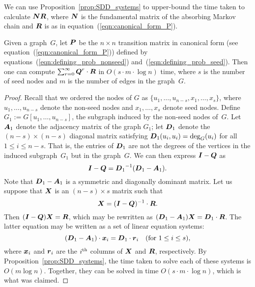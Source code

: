 We can use Proposition~\ref{prop:SDD_systems} to upper-bound the time taken to 
calculate $\boldsymbol{N} \boldsymbol{R}$, where $\boldsymbol{N}$ is the fundamental matrix of the absorbing
Markov chain and $\boldsymbol{R}$ is as in equation~(\ref{eqn:canonical_form_P}).
\begin{lemma}\label{lemma:computing_NR}
Given a graph~$G$, let $\boldsymbol{P}$ be the $n \times n$ transition matrix in canonical form 
(see equation~(\ref{eqn:canonical_form_P})) defined by equations~(\ref{eqn:defining_prob_nonseed}) 
and~(\ref{eqn:defining_prob_seed}). Then one can compute 
$\sum_{r = 0}^{\infty} \boldsymbol{Q}^r \cdot \boldsymbol{R}$ in $O(s \cdot m \cdot \log n)$ time, 
where $s$ is the number of seed nodes and $m$ is the number of edges in the graph~$G$.
\end{lemma}  
\begin{proof}
Recall that we ordered the nodes of $G$ as $\{u_1, \ldots, u_{n - s}, x_1, \ldots, x_s\}$, 
where $u_1, \ldots, u_{n - s}$ denote the non-seed nodes and $x_1, \ldots, x_s$ denote 
seed nodes. Define $G_1 := G[u_1, \ldots, u_{n - s}]$, the subgraph induced by the non-seed nodes 
of~$G$. Let $\boldsymbol{A}_1$ denote the adjacency matrix of the graph $G_1$; let 
$\boldsymbol{D}_1$ denote the $(n - s) \times (n - s)$ diagonal matrix satisfying 
$\boldsymbol{D}_1(u_i, u_i) = \deg_{G}(u_i)$ for all $1 \leq i \leq n - s$.  That is, the 
entries of $\boldsymbol{D}_1$ are not the degrees of the vertices in the induced subgraph~$G_1$ 
but in the graph~$G$. We can then express 
$\boldsymbol{I} - \boldsymbol{Q}$ as 
\[
	\boldsymbol{I}  - \boldsymbol{Q} = {\boldsymbol{D}_1}^{-1} (\boldsymbol{D}_1 - \boldsymbol{A}_1).
\]   
Note that $\boldsymbol{D}_1 - \boldsymbol{A}_1$ is a symmetric and diagonally dominant matrix. 
Let us suppose that $\boldsymbol{X}$ is an $(n - s) \times s$ matrix such that 
\[
	\boldsymbol{X} = (\boldsymbol{I} - \boldsymbol{Q})^{-1} \cdot \boldsymbol{R}.
\]
Then $(\boldsymbol{I} - \boldsymbol{Q}) \boldsymbol{X} = \boldsymbol{R}$, which may be rewritten as
$(\boldsymbol{D}_1 - \boldsymbol{A}_1) \boldsymbol{X} = \boldsymbol{D}_1 \cdot \boldsymbol{R}$. The latter 
equation may be written as a set of linear equation systems:
\begin{equation}\label{eqn:laplacian_linear_eqn}
	(\boldsymbol{D}_1 - \boldsymbol{A}_1) \cdot \boldsymbol{x}_i = \boldsymbol{D}_1 \cdot \boldsymbol{r}_i  \quad (\mbox{for } 1 \leq i \leq s),
\end{equation} 
where $\boldsymbol{x}_i$ and $\boldsymbol{r}_i$ are the $i^{\textrm{th}}$ columns of $\boldsymbol{X}$ and $\boldsymbol{R}$, respectively. 
By Proposition~\ref{prop:SDD_systems}, the time taken to solve each of these systems 
is $O(m \log n)$. Together, they can be solved in time $O(s \cdot m \cdot \log n)$, which
is what was claimed.  

\end{proof} 
